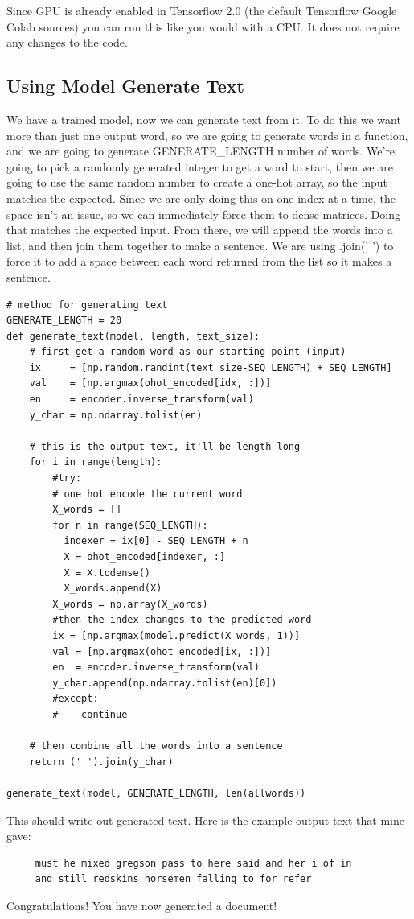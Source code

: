 \documentclass{article}
\begin{document}
 Since GPU is already enabled in Tensorflow 2.0 (the default Tensorflow Google Colab sources) you can run this like you would with a CPU. It does not require any changes to the code. 
  
  
  \subsection{Using Model Generate Text}
 We have a trained model, now we can generate text from it. To do this we want more than just one output word, so we are going to generate words in a function, and we are going to generate GENERATE\_LENGTH number of words. We're going to pick a randomly generated integer to get a word to start, then we are going to use the same random number to create a one-hot array, so the input matches the expected. Since we are only doing this on one index at a time, the space isn't an issue, so we can immediately force them to dense matrices. Doing that matches the expected input. From there, we will append the words into a list, and then join them together to make a sentence.  We are using .join(' ') to force it to add a space between each word returned from the list so it makes a sentence.
 
 
 \begin{verbatim}
# method for generating text
GENERATE_LENGTH = 20
def generate_text(model, length, text_size):
    # first get a random word as our starting point (input)
    ix     = [np.random.randint(text_size-SEQ_LENGTH) + SEQ_LENGTH]
    val    = [np.argmax(ohot_encoded[idx, :])]
    en     = encoder.inverse_transform(val)
    y_char = np.ndarray.tolist(en)

    # this is the output text, it'll be length long
    for i in range(length):
        #try:
        # one hot encode the current word
        X_words = []
        for n in range(SEQ_LENGTH):
          indexer = ix[0] - SEQ_LENGTH + n
          X = ohot_encoded[indexer, :]
          X = X.todense()
          X_words.append(X)
        X_words = np.array(X_words)
        #then the index changes to the predicted word 
        ix = [np.argmax(model.predict(X_words, 1))]
        val = [np.argmax(ohot_encoded[ix, :])]
        en  = encoder.inverse_transform(val)
        y_char.append(np.ndarray.tolist(en)[0])
        #except:
        #    continue

    # then combine all the words into a sentence        
    return (' ').join(y_char)

generate_text(model, GENERATE_LENGTH, len(allwords))
 \end{verbatim}
 
 This should write out generated text. Here is the example output text that mine gave:
 
 \begin{verbatim}
     must he mixed gregson pass to here said and her i of in 
     and still redskins horsemen falling to for refer
 \end{verbatim}
 
 Congratulations! You have now generated a document!
 
\end{document}

